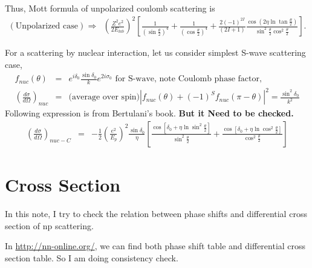 \documentclass[10pt]{book}
\newcommand{\bea}{\begin{eqnarray}}
\newcommand{\eea}{\end{eqnarray}}
\newcommand{\no}{\nonumber \\}
\begin{document}
Thus, {\color{red}Mott formula} of unpolarized coulomb scattering is 
\bea 
(\mbox{Unpolarized case})&\Rightarrow& 
          \left( \frac{Z^2 e^2}{2E_{lab}}\right)^2\left[ 
           \frac{1}{(\sin\frac{\theta}{2})^4}+\frac{1}{(\cos\frac{\theta}{2})^4}
                    +\frac{2(-1)^{2I}}{(2I+1)}  \frac{\cos(2\eta\ln\tan\frac{\theta}{2})}{\sin^2\frac{\theta}{2} \cos^2\frac{\theta}{2}}
          \right].
\eea 

For a scattering by nuclear interaction, let us consider simplest S-wave scattering case,
\bea 
f_{nuc}(\theta)
&=& e^{i\delta_0}\frac{\sin\delta_0}{k}e^{2i\sigma_0}  \mbox{ for S-wave, note Coulomb phase factor} ,\no 
\left(\frac{d\sigma}{d\Omega}\right)_{nuc}&=&
 \mbox{(average over spin)}|f_{nuc}(\theta)+(-1)^S f_{nuc}(\pi-\theta)|^2
 = \frac{\sin^2\delta_0}{k^2}
\eea 
Following expression is 
from Bertulani's book. {\bf But it Need to be checked.}
\bea 
\left(\frac{d\sigma}{d\Omega}\right)_{nuc-C}
&=& -\frac{1}{2}(\frac{e^2}{E_p})^2\frac{\sin\delta_0}{\eta}
    \left[\frac{\cos[\delta_0+\eta\ln\sin^2\frac{\theta}{2}]}{\sin^2\frac{\theta}{2}}
         +\frac{\cos[\delta_0+\eta\ln\cos^2\frac{\theta}{2}]}{\cos^2\frac{\theta}{2}}
    \right]
\eea 



\chapter{Cross Section}
In this note, I try to check the relation between phase shifts 
and differential cross section of np scattering.

In \url{http://nn-online.org/}, we can find both phase shift table and
differential cross section table. So I am doing consistency check.
\end{document}
